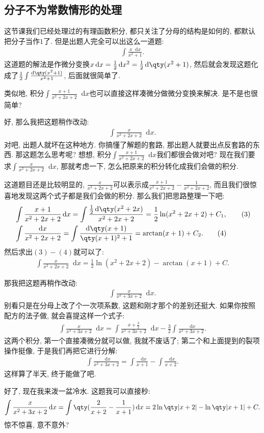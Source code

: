 \documentclass{ctexbook}
\newcommand*{\dif}{\mathop{}\!\mathrm{d}}
\begin{document}
{\subsection{分子不为常数情形的处理}
这节课我们已经处理过的有理函数积分, 都只关注了分母的结构是如何的, 都默认把分子当作$1$了. 但是出题人完全可以出这么一道题: 
\begin{align*}
\int\frac{x\dif{x}}{x^{2}+1}
.\end{align*}
这道题的解法是作微分变换$x\dif{x}=\frac{1}{2}\dif{x^{2}}=\frac{1}{2}\dif{\qty(x^{2}+1)}$, 然后就会发现这题化成了$\frac{1}{2}\int\frac{\dif{\qty(x^{2}+1)}}{x^{2}+1}$, 后面就很简单了. \par
类似地, 积分$\int\frac{x+1}{x^{2}+2x+2}\dif{x}$也可以直接这样凑微分做微分变换来解决. 是不是也很简单? \par
好, 那么我把这题稍作改动: 
\begin{align*}
\int\frac{x}{x^{2}+2x+2}\dif{x}
.\end{align*}
对吧, 出题人就坏在这种地方. 你搞懂了解题的套路, 那出题人就要出点反套路的东西. 那这题怎么思考呢? 想想, 积分$\int\frac{x+1}{x^{2}+2x+2}\dif{x}$我们都很会做对吧? 现在我们要求$\int\frac{x}{x^{2}+2x+2}\dif{x}$, 那就考虑一下, 怎么把原来的积分转化成我们会做的积分. \par
这道题目还是比较明显的, $\frac{x}{x^{2}+2x+2}$可以表示成$\frac{x+1}{x^{2}+2x+2}-\frac{1}{x^{2}+2x+2}$, 而且我们很惊喜地发现这两个式子都是我们会做的积分. 那么我们把思路整理一下吧: 
\begin{align*}
{}&\int\frac{x+1}{x^{2}+2x+2}\dif{x}=\int\frac{\frac{1}{2}\dif{\qty(x^{2}+2x)}}{x^{2}+2x+2}=\frac{1}{2}\ln(x^{2}+2x+2)+C_{1},\tag{3}\\
{}&\int\frac{\dif{x}}{x^{2}+2x+2}=\int\frac{\dif{\qty(x+1)}}{\qty(x+1)^{2}+1}=\arctan(x+1)+C_{2}.\tag{4}
\end{align*}
然后求出$(3)-(4)$就可以了: 
\begin{align*}
\int\frac{x}{x^{2}+2x+2}\dif{x}=\frac{1}{2}\ln(x^{2}+2x+2)-\arctan(x+1)+C
.\end{align*}\par
那我把这题再稍作改动: 
\begin{align*}
\int\frac{x}{x^{2}+3x+2}\dif{x}
.\end{align*}
别看只是在分母上改了个一次项系数, 这题和刚才那个的差别还挺大. 如果你按照配方的法子做, 就会喜提这样一个式子: 
\begin{align*}
\int\frac{x}{x^{2}+3x+2}\dif{x}=\int\frac{x+\frac{3}{2}}{x^{2}+3x+2}\dif{x}-\frac{3}{2}\int\frac{\dif{x}}{x^{2}+3x+2}
.\end{align*}
这两个积分, 第一个直接凑微分就可以做, 我就不废话了; 第二个和上面提到的裂项操作挺像, 于是我们再把它进行分解: 
\begin{align*}
\int\frac{\dif{x}}{x^{2}+3x+2}=\int\frac{\dif{x}}{x+1}-\int\frac{\dif{x}}{x+2}
.\end{align*}
这样算了半天, 终于能做了吧. \par
好了, 现在我来泼一盆冷水. 这题我可以直接秒: 
\begin{align*}
\int\frac{x}{x^{2}+3x+2}\dif{x}=\int\qty(\frac{2}{x+2}-\frac{1}{x+1})\dif{x}=2\ln\qty|x+2|-\ln\qty|x+1|+C
.\end{align*}
惊不惊喜, 意不意外? \par
}
\end{document}
